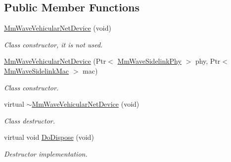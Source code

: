 \subsection*{Public Member Functions}
\begin{DoxyCompactItemize}
\item 
\mbox{\label{classns3_1_1millicar_1_1MmWaveVehicularNetDevice_abb8b5c9f12799567e525f0bbf44df43f}} 
\hyperlink{classns3_1_1millicar_1_1MmWaveVehicularNetDevice_abb8b5c9f12799567e525f0bbf44df43f}{Mm\+Wave\+Vehicular\+Net\+Device} (void)
\begin{DoxyCompactList}\small\item\em Class constructor, it is not used. \end{DoxyCompactList}\item 
\hyperlink{classns3_1_1millicar_1_1MmWaveVehicularNetDevice_a45198022453e183d1d0337cd6871d24d}{Mm\+Wave\+Vehicular\+Net\+Device} (Ptr$<$ \hyperlink{classns3_1_1millicar_1_1MmWaveSidelinkPhy}{Mm\+Wave\+Sidelink\+Phy} $>$ phy, Ptr$<$ \hyperlink{classns3_1_1millicar_1_1MmWaveSidelinkMac}{Mm\+Wave\+Sidelink\+Mac} $>$ mac)
\begin{DoxyCompactList}\small\item\em Class constructor. \end{DoxyCompactList}\item 
\mbox{\label{classns3_1_1millicar_1_1MmWaveVehicularNetDevice_a31c5848049ce3b89cb9635bb8763b57e}} 
virtual \hyperlink{classns3_1_1millicar_1_1MmWaveVehicularNetDevice_a31c5848049ce3b89cb9635bb8763b57e}{$\sim$\+Mm\+Wave\+Vehicular\+Net\+Device} (void)
\begin{DoxyCompactList}\small\item\em Class destructor. \end{DoxyCompactList}\item 
\mbox{\label{classns3_1_1millicar_1_1MmWaveVehicularNetDevice_a83508411865ea28c89701ccedc00db57}} 
virtual void \hyperlink{classns3_1_1millicar_1_1MmWaveVehicularNetDevice_a83508411865ea28c89701ccedc00db57}{Do\+Dispose} (void)
\begin{DoxyCompactList}\small\item\em Destructor implementation. \end{DoxyCompactList}\item 

\end{DoxyCompactItemize}
